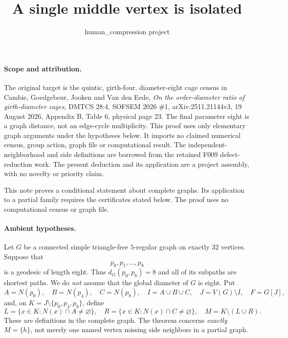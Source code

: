 \documentclass[11pt]{article}
\title{A single middle vertex is isolated}
\author{human\_compression project}
\date{}
\begin{document}
\maketitle

\paragraph{Scope and attribution.}
The original target is the quintic, girth-four, diameter-eight cage census
in Cambie, Goedgebeur, Jooken and Van den Eede,
\emph{On the order-diameter ratio of girth-diameter cages},
DMTCS 28:4, SOFSEM 2026 \#1, arXiv:2511.21144v3,
19 August 2026, Appendix B, Table 6, physical page 23.
The final parameter eight is a graph distance, not an edge-cycle
multiplicity. This proof uses only elementary graph arguments under the
hypotheses below. It imports no claimed numerical census, group action,
graph file or computational result. The independent-neighborhood and side
definitions are borrowed from the retained F009 defect-reduction work.
The present deduction and its application are a project assembly, with
no novelty or priority claim.

This note proves a conditional statement about complete graphs.
Its application to a partial family requires the certificates stated below.
The proof uses no computational census or graph file.

\paragraph{Ambient hypotheses.}
Let $G$ be a connected simple triangle-free $5$-regular graph on exactly
$32$ vertices. Suppose that
\[
 p_0,p_1,\ldots,p_8
\]
is a geodesic of length eight. Thus $d_G(p_0,p_8)=8$ and all of its
subpaths are shortest paths. We do \emph{not} assume that the global
diameter of $G$ is eight. Put
\[
 A=N(p_0),\quad B=N(p_4),\quad C=N(p_8),\quad
 I=A\cup B\cup C,\quad J=V(G)\setminus I,\quad F=G[J],
\]
and, on $K=J\setminus\{p_0,p_4,p_8\}$, define
\[
 L=\{x\in K:N(x)\cap A\ne\varnothing\},\quad
 R=\{x\in K:N(x)\cap C\ne\varnothing\},\quad
 M=K\setminus(L\cup R).
\]
These are definitions in the complete graph. The theorem concerns
\emph{exactly} $M=\{h\}$, not merely one named vertex missing side
neighbors in a partial graph.
\end{document}
